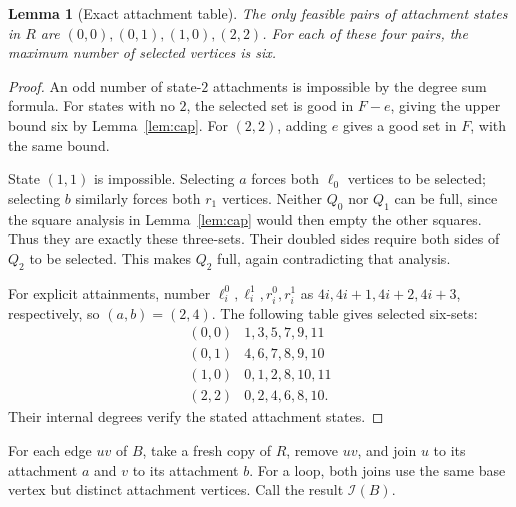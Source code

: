 \documentclass[11pt]{article}
\newtheorem{lemma}[theorem]{Lemma}
\begin{document}
\begin{lemma}[Exact attachment table]\label{lem:edge-table}
The only feasible pairs of attachment states in $R$ are
$(0,0),(0,1),(1,0),(2,2)$. For each of these four pairs, the maximum
number of selected vertices is six.
\end{lemma}
\begin{proof}
An odd number of state-$2$ attachments is impossible by the degree
sum formula. For states with no $2$, the selected set is good in
$F-e$, giving the upper bound six by Lemma~\ref{lem:cap}.
For $(2,2)$, adding $e$ gives a good set in $F$, with the same bound.

State $(1,1)$ is impossible. Selecting $a$ forces both $\ell_0$
vertices to be selected; selecting $b$ similarly forces both $r_1$
vertices. Neither $Q_0$ nor $Q_1$ can be full, since the square
analysis in Lemma~\ref{lem:cap} would then empty the other squares.
Thus they are exactly these three-sets. Their doubled sides require
both sides of $Q_2$ to be selected. This makes $Q_2$ full, again
contradicting that analysis.

For explicit attainments, number $\ell_i^0,\ell_i^1,r_i^0,r_i^1$
as $4i,4i+1,4i+2,4i+3$, respectively, so $(a,b)=(2,4)$.
The following table gives selected six-sets:
\[
\begin{array}{c|l}
 (0,0)&1,3,5,7,9,11\\
 (0,1)&4,6,7,8,9,10\\
 (1,0)&0,1,2,8,10,11\\
 (2,2)&0,2,4,6,8,10.
\end{array}
\]
Their internal degrees verify the stated attachment states.
\end{proof}

For each edge $uv$ of $B$, take a fresh copy of $R$, remove $uv$,
and join $u$ to its attachment $a$ and $v$ to its attachment $b$.
For a loop, both joins use the same base vertex but distinct
attachment vertices. Call the result $\mathcal I(B)$.
\end{document}
